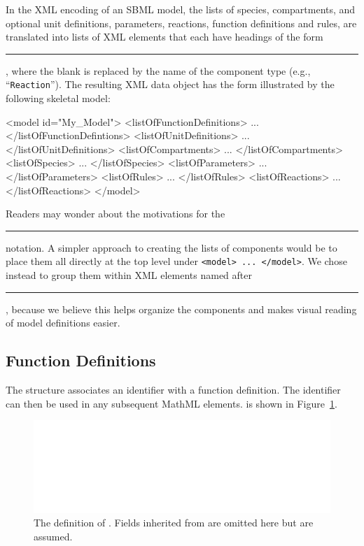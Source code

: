 \documentclass[10pt,twocolumntoc]{cekarticle}
\newcommand{\vref}[1]{\ref{#1}}
\begin{document}
In the XML encoding of an SBML model, the lists of species,
compartments, and optional unit definitions, parameters,
reactions, function definitions and rules, are translated into
lists of XML elements that each have headings of the form
\rule{0.5in}{0.5pt}, where the blank is
replaced by the name of the component type (e.g.,
``\texttt{Reaction}'').  The resulting XML data object has the
form illustrated by the following skeletal model:

\begin{example}
<model id="My_Model">
    <listOfFunctionDefinitions>
        ...
    </listOfFunctionDefintions>
    <listOfUnitDefinitions>
        ...
    </listOfUnitDefinitions>
    <listOfCompartments>
        ...
    </listOfCompartments>
    <listOfSpecies>
        ...
    </listOfSpecies>
    <listOfParameters>
        ...
    </listOfParameters>
    <listOfRules>
        ...
    </listOfRules>
    <listOfReactions>
        ...
    </listOfReactions>
</model>
\end{example}

Readers may wonder about the motivations for the
\rule{0.5in}{0.5pt} notation.  A simpler approach to
creating the lists of components would be to place them all directly
at the top level under \texttt{<model> ... </model>}.  We chose instead to
group them within XML elements named after
\rule{0.5in}{0.5pt}, because we believe this helps
organize the components and makes visual reading of model definitions
easier.

\subsection{Function Definitions}
\label{sec:functions}

The  structure associates an identifier with a
function definition.  The identifier can then be used in any subsequent
MathML  elements.   is shown in
Figure~\vref{fig:mathdefinition}.

\begin{figure}[htb]
  \centering
  \includegraphics[scale = 0.68]{mathdefinition}
  \caption{The definition of .  Fields inherited
  from  are omitted here but are assumed.}
  \label{fig:mathdefinition}
\end{figure}
\end{document}
